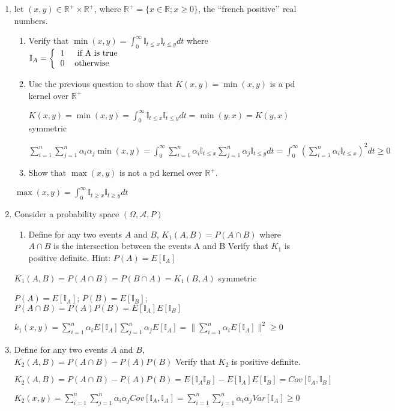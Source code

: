\documentclass[11pt]{article}
\begin{document}
\begin{enumerate}
\item let $(x,y) \in \mathbb{R}^+ \times \mathbb{R}^+$, where $\mathbb{R}^+=\{x \in \mathbb{R};x \geq 0\}$, the ``french positive\rq\rq{} real numbers. 

\begin{enumerate}
\item  Verify that $\min(x,y) = \int_0^\infty \mathbb{I}_{t\leq x} \mathbb{I}_{t\leq y} dt$
where  $\mathbb{I}_A =  \left\{
\begin{tabular}{ll}
1 & \mbox{ if A is true}\\
0 & \mbox{otherwise}
\end{tabular}\right.$

\item Use the previous question to show that $K(x,y)=\min(x,y)$ is a pd kernel over $\mathbb{R}^+$

$K(x,y)=\min(x,y)=\int_0^\infty \mathbb{I}_{t\leq x} \mathbb{I}_{t\leq y} dt=\min(y,x)=K(y,x)$ symmetric

$\sum_{i=1}^n\sum_{j=1}^n\alpha_i\alpha_j\min(x,y)=\int_0^\infty \sum_{i=1}^n\alpha_i\mathbb{I}_{t\leq x} \sum_{j=1}^n\alpha_j\mathbb{I}_{t\leq y} dt=\int_0^\infty (\sum_{i=1}^n\alpha_i\mathbb{I}_{t\leq x})^2dt\ge0$

\item Show that $\max(x,y)$ is not a pd kernel over  $\mathbb{R}^+$. 
\end{enumerate}

$\max(x,y)=\int_0^\infty \mathbb{I}_{t\geq x} \mathbb{I}_{t\geq y} dt$


\item Consider a probability space $(\Omega,\mathcal{A},P)$
\begin{enumerate}
\item Define for any two events $A$ and $B$, $K_1(A,B)=P(A \cap B)$
where $A \cap B$ is the intersection between the events A and B 
Verify that $K_1$ is positive definite. Hint: $P(A)=E[\mathbb{I}_A]$
\end{enumerate}

$K_1(A,B)=P(A \cap B)=P(B \cap A)=K_1(B,A)$ symmetric

$P(A)=E[\mathbb{I}_A]$; $P(B)=E[\mathbb{I}_B]$; $P(A\cap B)=P(A)P(B)=E[\mathbb{I}_A]E[\mathbb{I}_B]$

$k_1(x,y)=\sum_{i=1}^n\alpha_iE[\mathbb{I}_A]\sum_{j=1}^n\alpha_jE[\mathbb{I}_A]=\|\sum_{i=1}^n\alpha_iE[\mathbb{I}_A]\|^2\ge0$


\item Define for any two events $A$ and $B$, 
$K_2(A,B)=P(A \cap B)-P(A)P(B)$
Verify that $K_2$ is positive definite. 


$K_2(A,B)=P(A \cap B)-P(A)P(B)=E[\mathbb{I}_A\mathbb{I}_B]-E[\mathbb{I}_A]E[\mathbb{I}_B]=Cov[\mathbb{I}_A,\mathbb{I}_B]$

$K_2(x,y)=\sum_{i=1}^n\sum_{j=1}^n\alpha_i\alpha_jCov[\mathbb{I}_A,\mathbb{I}_A]=\sum_{i=1}^n\sum_{j=1}^n\alpha_i\alpha_jVar[\mathbb{I}_A]\ge 0$




\end{enumerate}
\end{document}
